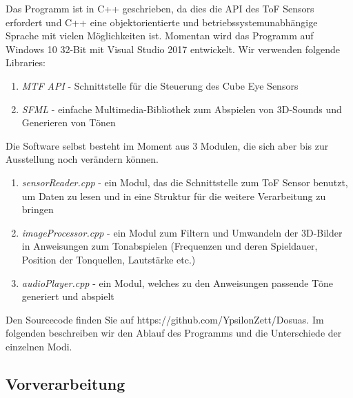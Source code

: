 \documentclass[a4paper,12pt,ngerman]{scrartcl}
\begin{document}
Das Programm ist in C++ geschrieben, da dies die API des ToF Sensors erfordert und C++ eine objektorientierte und betriebssystemunabhängige Sprache mit vielen Möglichkeiten ist. Momentan wird das Programm
auf Windows 10 32-Bit mit Visual Studio 2017 entwickelt.
Wir verwenden folgende Libraries:
\begin{enumerate}
	\item \textit{MTF API} - Schnittstelle für die Steuerung des Cube Eye Sensors
	\item \textit{SFML} - einfache Multimedia-Bibliothek zum Abspielen von 3D-Sounds und Generieren von Tönen
\end{enumerate} 
Die Software selbst besteht im Moment aus 3 Modulen, die sich aber bis zur Ausstellung noch verändern 
können.
\begin{enumerate}
	\item \textit{sensorReader.cpp} - ein Modul, das die Schnittstelle zum ToF Sensor benutzt, um Daten zu 
	lesen und in eine Struktur für die weitere Verarbeitung zu bringen
	\item \textit{imageProcessor.cpp} - ein Modul zum Filtern und Umwandeln der 3D-Bilder in Anweisungen zum 
	Tonabspielen (Frequenzen und deren Spieldauer, Position der Tonquellen, Lautstärke etc.)
	\item \textit{audioPlayer.cpp} - ein Modul, welches zu den Anweisungen passende Töne generiert und abspielt
\end{enumerate}
Den Sourcecode finden Sie auf https://github.com/YpsilonZett/Dosuas.
Im folgenden beschreiben wir den Ablauf des Programms und die Unterschiede der einzelnen Modi.

\subsection{Vorverarbeitung}
\end{document}
